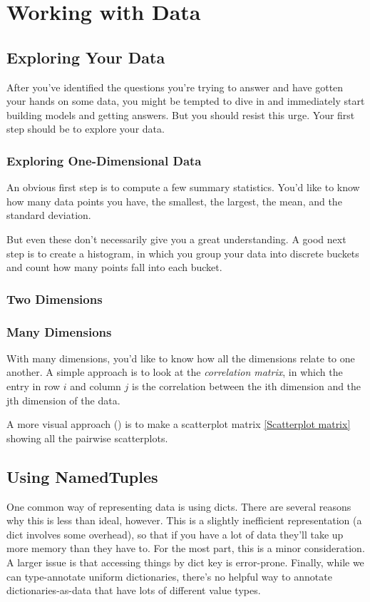 \chapter{Working with Data}
\section{Exploring Your Data}
After you've identified the questions you're trying to answer and have gotten your
hands on some data, you might be tempted to dive in and immediately start building
models and getting answers. But you should resist this urge. Your first step should be
to explore your data.
\subsection{Exploring One-Dimensional Data}
An obvious first step is to compute a few summary statistics. You'd like to know how
many data points you have, the smallest, the largest, the mean, and the standard deviation.

But even these don't necessarily give you a great understanding. A good next step is to
create a histogram, in which you group your data into discrete buckets and count how
many points fall into each bucket.

\subsection{Two Dimensions}
\subsection{Many Dimensions}
With many dimensions, you'd like to know how all the dimensions relate to one
another. A simple approach is to look at the \emph{correlation matrix}, in which the entry in
row $i$ and column $j$ is the correlation between the ith dimension and the jth dimension of the data.


A more visual approach () is to make a scatterplot matrix \autoref{Scatterplot matrix} showing all the pairwise scatterplots.


\section{Using NamedTuples}

One common way of representing data is using dicts. There are several reasons why this is less than ideal, however. This is a slightly inefficient representation (a dict involves some overhead), so that if you have a lot of data they'll take up more memory than they have to. For the most part, this is a
minor consideration. A larger issue is that accessing things by dict key is error-prone. Finally, while we can type-annotate uniform dictionaries, there's no helpful way to annotate dictionaries-as-data that have lots of different value
types.


